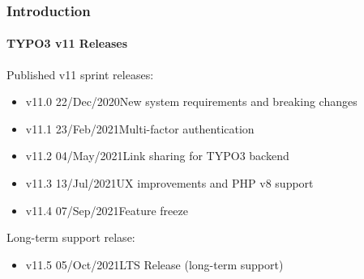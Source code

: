 %

\begin{frame}[fragile]
	\frametitle{Introduction}
	\framesubtitle{TYPO3 v11 Releases}

	Published v11 sprint releases:

	\begin{itemize}
		\item v11.0 \tabto{1.1cm}22/Dec/2020\tabto{3.4cm}New system requirements and breaking changes
		\item v11.1 \tabto{1.1cm}23/Feb/2021\tabto{3.4cm}Multi-factor authentication
		\item v11.2 \tabto{1.1cm}04/May/2021\tabto{3.4cm}Link sharing for TYPO3 backend
		\item v11.3 \tabto{1.1cm}13/Jul/2021\tabto{3.4cm}UX improvements and PHP v8 support
		\item v11.4 \tabto{1.1cm}07/Sep/2021\tabto{3.4cm}Feature freeze
	\end{itemize}

	\vspace{0.2cm}
	Long-term support relase:

	\begin{itemize}
		\item v11.5 \tabto{1.1cm}05/Oct/2021\tabto{3.4cm}LTS Release (long-term support)
	\end{itemize}

\end{frame}

